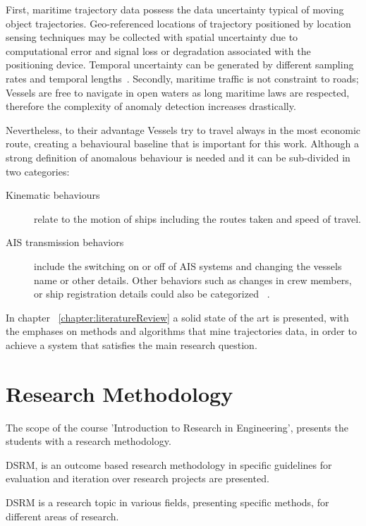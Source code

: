 First, maritime trajectory data possess the data uncertainty typical of moving object trajectories.
Geo-referenced locations of trajectory positioned by location sensing techniques may be collected with spatial uncertainty due to computational error and signal loss or degradation associated with the positioning device. Temporal uncertainty can be generated by different sampling rates and temporal lengths~\cite{Lee}. Secondly, maritime traffic is not constraint to roads; Vessels are free to navigate in open waters 
as long maritime laws are respected, therefore the complexity of anomaly detection increases drastically.

Nevertheless, to their advantage Vessels try to travel always in the most economic route, creating a behavioural baseline that is important for this work. Although a strong definition of anomalous behaviour is needed and it can be sub-divided in two categories:

\begin{description}
\item[Kinematic behaviours] relate to the motion of ships including the routes taken and speed of travel.
\item [AIS transmission behaviors] include the switching on or off of AIS systems and changing the vessels name or other details. Other behaviors such as changes in crew members, or ship registration details could also be categorized ~\cite{Lane2010}.
\end{description}

In chapter ~\ref{chapter:literatureReview} a solid state of the art is presented, with the emphases on methods and algorithms that mine trajectories data, in order to achieve a system that satisfies the main research question.


\section{Research Methodology}
The scope of the course 'Introduction to Research in Engineering', presents the students with a research methodology.

DSRM, is an outcome based research methodology in specific guidelines for evaluation and iteration over research projects are presented.

DSRM is a research topic in various fields, presenting specific methods, for different areas of research. 

